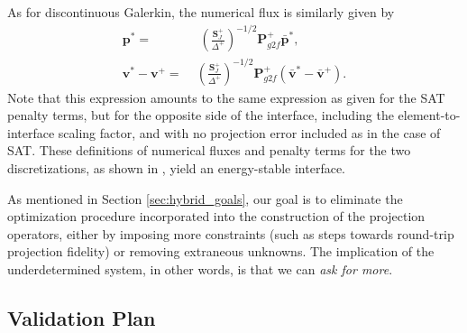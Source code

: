 As for discontinuous Galerkin, the numerical flux is similarly given by 
\begin{align}
  \label{eqn:dg:noncon:v}
  \pmb{p}^{*} = &\;
  {\left(
      \frac{\pmb{S}_{J}^{+}}{\Delta^{+}}
  \right)}^{-1/2}\pmb{P}_{g2f}^{+}\bar{\pmb{p}}^{*},\\
  \label{eqn:dg:noncon:p}
  \pmb{v}^{*} - \pmb{v}^{+} =\;&
  {\left(
      \frac{\pmb{S}_{J}^{+}}{\Delta^{+}}
  \right)}^{-1/2}
\pmb{P}_{g2f}^{+}
  \left(
    \pmb{\bar{v}}^{*} - \pmb{\bar{v}}^{+}
  \right).
\end{align}
Note that this expression amounts to the same expression as given for the SAT penalty terms,
but for the opposite side of the interface, including the element-to-interface scaling factor,
and with no projection error included as in the case of SAT. These definitions of numerical
fluxes and penalty terms for the two discretizations, as shown in \cite{kozdon2016stable},
yield an energy-stable interface.

As mentioned in Section \ref{sec:hybrid_goals}, our goal is to eliminate the optimization
procedure incorporated into the construction of the projection operators, either by imposing
more constraints (such as steps towards round-trip projection fidelity) or removing extraneous
unknowns. The implication of the underdetermined system, in other words, is that we can
\emph{ask for more}.

\subsection{Validation Plan}

